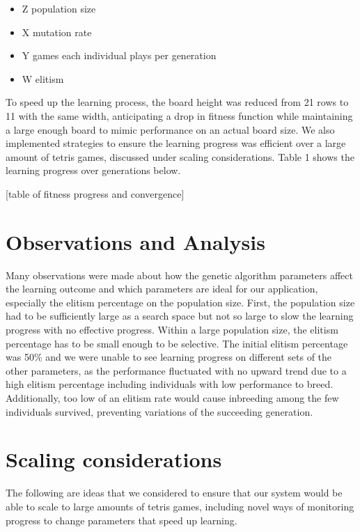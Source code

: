 \documentclass[12pt,a4paper]{report}
\begin{document}
\begin{itemize}
\item Z population size
\item X mutation rate
\item Y games each individual plays per generation
\item W elitism
\end{itemize}

To speed up the learning process, the board height was reduced from 21 rows to 11 with the same width, anticipating a drop in fitness function while maintaining a large enough board to mimic performance on an actual board size. We also implemented strategies to ensure the learning progress was efficient over a large amount of tetris games, discussed under scaling considerations. Table 1 shows the learning progress over generations below.

[table of fitness progress and convergence]

\section{Observations and Analysis}
Many observations were made about how the genetic algorithm parameters affect the learning outcome and which parameters are ideal for our application, especially the elitism percentage on the population size. First, the population size had to be sufficiently large as a search space but not so large to slow the learning progress with no effective progress. Within a large population size, the elitism percentage has to be small enough to be selective. The initial elitism percentage was 50\% and we were unable to see learning progress on different sets of the other parameters, as the performance fluctuated with no upward trend due to a high elitism percentage including individuals with low performance to breed. Additionally, too low of an elitism rate would cause inbreeding among the few individuals survived, preventing variations of the succeeding generation.

\section{Scaling considerations}
The following are ideas that we considered to ensure that our system would be able to scale to large amounts of tetris games, including novel ways of monitoring progress to change parameters that speed up learning.
\end{document}
